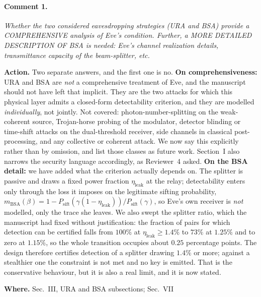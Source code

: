 \documentclass[10pt]{article}
\newcommand{\Psift}{P_{\mathrm{sift}}}
\newcommand{\rev}[1]{\par\medskip\noindent\textit{#1}\par\smallskip}
\newcommand{\act}[2]{\noindent\textbf{Action.} #1\par\noindent\textbf{Where.} #2\par}
\begin{document}
\paragraph{Comment 1.}
\rev{Whether the two considered eavesdropping strategies (URA and BSA) provide a COMPREHENSIVE analysis of Eve's condition. Further, a MORE DETAILED DESCRIPTION OF BSA is needed: Eve's channel realization details, transmittance capacity of the beam-splitter, etc.}
\act{Two separate answers, and the first one is no. \textbf{On comprehensiveness:} URA and BSA are \emph{not} a comprehensive treatment of Eve, and the manuscript should not have left that implicit. They are the two attacks for which this physical layer admits a closed-form detectability criterion, and they are modelled \emph{individually}, not jointly. Not covered: photon-number-splitting on the weak-coherent source, Trojan-horse probing of the modulator, detector blinding or time-shift attacks on the dual-threshold receiver, side channels in classical post-processing, and any collective or coherent attack. We now say this explicitly rather than by omission, and list those classes as future work. Section~I also narrows the security language accordingly, as Reviewer~4 asked. \textbf{On the BSA detail:} we have added what the criterion actually depends on. The splitter is passive and draws a fixed power fraction $\eta_{\mathrm{leak}}$ at the relay; detectability enters only through the loss it imposes on the legitimate sifting probability, $m_{\mathrm{BSA}}(\beta)=1-\Psift(\gamma(1-\eta_{\mathrm{leak}}))/\Psift(\gamma)$, so Eve's own receiver is \emph{not} modelled, only the trace she leaves. We also swept the splitter ratio, which the manuscript had fixed without justification: the fraction of pairs for which detection can be certified falls from $100\%$ at $\eta_{\mathrm{leak}}\ge1.4\%$ to $73\%$ at $1.25\%$ and to zero at $1.15\%$, so the whole transition occupies about $0.25$ percentage points. The design therefore certifies detection of a splitter drawing $1.4\%$ or more; against a stealthier one the constraint is not met and no key is emitted. That is the conservative behaviour, but it is also a real limit, and it is now stated.}{Sec.~III, URA and BSA subsections; Sec.~VII}
\end{document}
